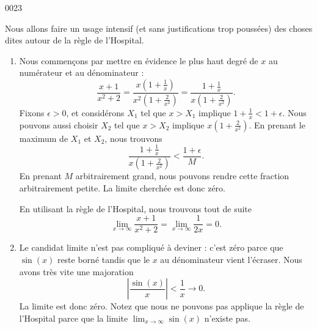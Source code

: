 
\begin{corrige}{0023}

Nous allons faire un usage intensif (et sans justifications trop poussées) des choses dites autour de la règle de l'Hospital.

\begin{enumerate}

\item
 Nous commençons par mettre en évidence le plus haut degré de $x$ au numérateur et au dénominateur :
\begin{equation}
	\frac{ x+1 }{ x^2+2 }=\frac{ x\left( 1+\frac{1}{ x } \right) }{ x^2\left( 1+\frac{ 2 }{ x^2 } \right) }=\frac{ 1+\frac{1}{ x } }{ x\left( 1+\frac{ 2 }{ x^2 } \right) }.
\end{equation}
Fixons $\epsilon>0$, et considérons $X_1$ tel que $x>X_1$ implique $1+\frac{1}{ x }<1+\epsilon$. Nous pouvons aussi choisir $X_2$ tel que $x>X_2$ implique $x\left( 1+\frac{ 2 }{ x^2 } \right)$. En prenant le maximum de $X_1$ et $X_2$, nous trouvons
\begin{equation}
\frac{ 1+\frac{1}{ x } }{ x\left( 1+\frac{ 2 }{ x^2 } \right) }<\frac{ 1+\epsilon }{ M }.
\end{equation}
En prenant $M$ arbitrairement grand, nous pouvons rendre cette fraction arbitrairement petite. La limite cherchée est donc zéro.

\begin{alternative}
En utilisant la règle de l'Hospital, nous trouvons tout de suite
\begin{equation}
	\lim_{x\to\infty}\frac{ x+1 }{ x^2+2 }=\lim_{x\to\infty}\frac{ 1 }{ 2x }=0.
\end{equation}
\end{alternative}

\item
Le candidat limite n'est pas compliqué à deviner : c'est zéro parce que $\sin(x)$ reste borné tandis que le $x$ au dénominateur vient l'écraser. Nous avons très vite une majoration
\begin{equation}
	\left| \frac{ \sin(x)}{ x } \right| <\frac{1}{ x }\to 0.
\end{equation}
La limite est donc zéro. Notez que nous ne pouvons pas applique la règle de l'Hospital parce que la limite $\lim_{x\to\infty}\sin(x)$ n'existe pas.


\end{enumerate}
\end{corrige}
